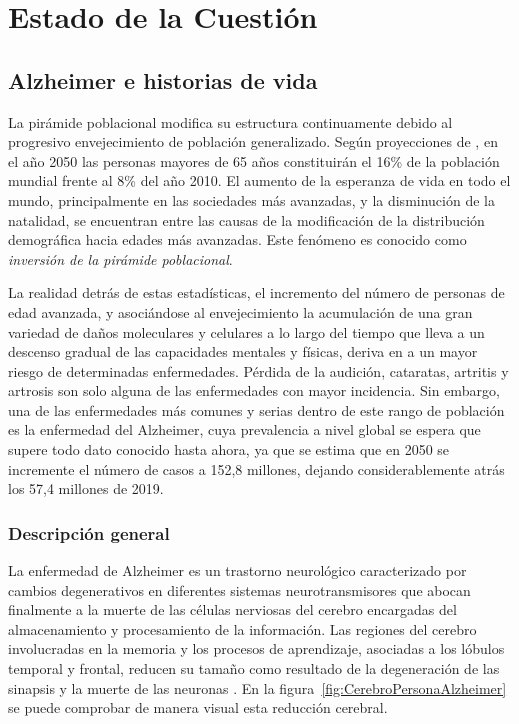 \chapter{Estado de la Cuestión}
\label{cap:estadoDeLaCuestion}


\section{Alzheimer e historias de vida}
La pirámide poblacional modifica su estructura continuamente debido al progresivo envejecimiento de población generalizado. Según proyecciones de \cite{estalz}, en el año 2050 las personas mayores de 65 años constituirán el 16\% de la población mundial frente al 8\% del año 2010. El aumento de la esperanza de vida en todo el mundo, principalmente en las sociedades más avanzadas, y la disminución de la natalidad, se encuentran entre las causas de la modificación de la distribución demográfica hacia edades más avanzadas. Este fenómeno es conocido como \textit{inversión de la pirámide poblacional}.

La realidad detrás de estas estadísticas, el incremento del número de personas de edad avanzada, y asociándose al envejecimiento la acumulación de una gran variedad de daños moleculares y celulares a lo largo del tiempo que lleva a un descenso gradual de las capacidades mentales y físicas,
deriva en a un mayor riesgo de determinadas enfermedades. Pérdida de la audición, cataratas, artritis y artrosis son solo alguna de las enfermedades con mayor incidencia. Sin embargo, una de las enfermedades más comunes y serias dentro de este rango de población es la enfermedad del Alzheimer, cuya prevalencia a nivel global se espera que supere todo dato conocido hasta ahora, ya que se estima que en 2050 se incremente el número de casos a 152,8 millones, dejando considerablemente atrás los 57,4 millones de 2019.





\subsection{Descripción general}
La enfermedad de Alzheimer es un trastorno neurológico caracterizado por cambios degenerativos en diferentes sistemas neurotransmisores que abocan finalmente a la muerte de las células nerviosas del cerebro encargadas del almacenamiento y procesamiento de la información. Las regiones del cerebro involucradas en la memoria y los procesos de aprendizaje, asociadas a los lóbulos temporal y frontal, reducen su tamaño como resultado de la degeneración de las sinapsis y la muerte de las neuronas \citep{romano2007enfermedad,mattson2004pathways}. En la figura~\ref{fig:CerebroPersonaAlzheimer} se puede comprobar de manera visual esta reducción cerebral.

